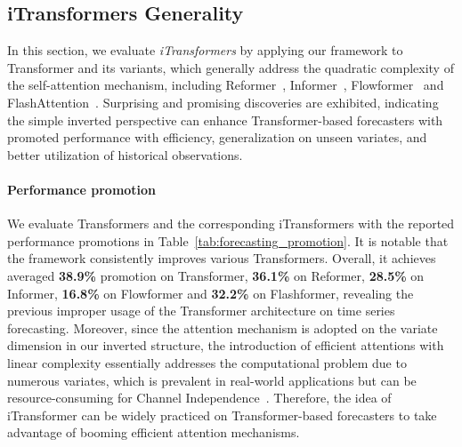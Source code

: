 \documentclass{article} %
\begin{document}
\subsection{iTransformers Generality}\label{sec:framework_generality}
In this section, we evaluate \emph{iTransformers} by applying our framework to Transformer and its variants, which generally address the quadratic complexity of the self-attention mechanism, including Reformer~\citep{kitaev2020reformer}, Informer~\citep{Informer}, 
Flowformer~\citep{wu2022flowformer} and FlashAttention~\citep{dao2022flashattention}. Surprising and promising discoveries are exhibited, indicating the simple inverted perspective can enhance Transformer-based forecasters with promoted performance with efficiency, generalization on unseen variates, and better utilization of historical observations.

\paragraph{Performance promotion} We evaluate Transformers and the corresponding iTransformers with the reported performance promotions in Table~\ref{tab:forecasting_promotion}. It is notable that the framework consistently improves various Transformers. Overall, it achieves averaged \textbf{38.9\%} promotion on Transformer, \textbf{36.1\%} on Reformer,  \textbf{28.5\%} on Informer, 
\textbf{16.8\%} on Flowformer and \textbf{32.2\%} on Flashformer, revealing the previous improper usage of the Transformer architecture on time series forecasting. Moreover, since the attention mechanism is adopted on the variate dimension in our inverted structure, the introduction of efficient attentions with linear complexity essentially addresses the computational problem due to numerous variates, which is prevalent in real-world applications but can be resource-consuming for Channel Independence~\citep{PatchTST}. Therefore, the idea of iTransformer can be widely practiced on Transformer-based forecasters to take advantage of booming efficient attention mechanisms.
\end{document}
